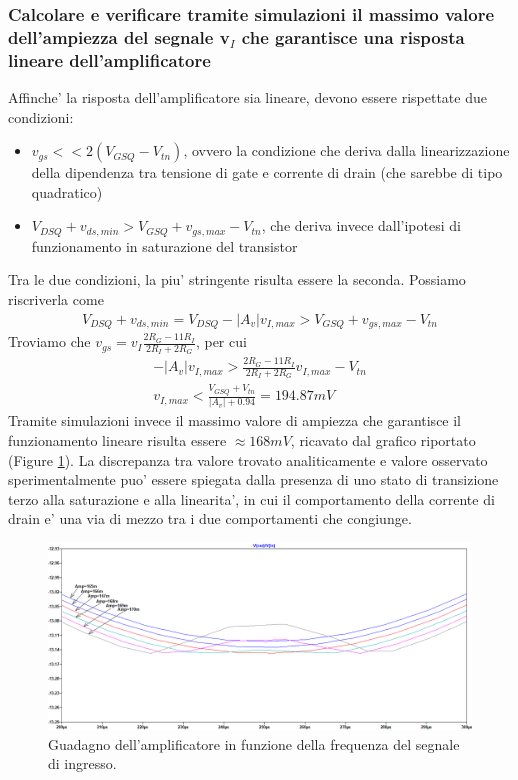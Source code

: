\documentclass[a4paper,10pt]{article}
\begin{document}
\subsubsection{Calcolare e verificare tramite simulazioni il massimo valore dell'ampiezza del segnale v$_I$ che garantisce una risposta lineare dell'amplificatore}
Affinche' la risposta dell'amplificatore sia lineare, devono essere rispettate due condizioni:
\begin{itemize}
 	\item \textit{$v_{gs} << 2(V_{GSQ}-V_{tn})$}, ovvero la condizione che deriva dalla linearizzazione della dipendenza tra tensione di gate e corrente di drain (che sarebbe di tipo quadratico)
 	\item \textit{$V_{DSQ} + v_{ds,min} > V_{GSQ}+v_{gs,max}-V_{tn}$}, che deriva invece dall'ipotesi di funzionamento in saturazione del transistor 
\end{itemize}
Tra le due condizioni, la piu' stringente risulta essere la seconda. Possiamo riscriverla come
\begin{gather*}
V_{DSQ} + v_{ds,min} = V_{DSQ} - |A_v|v_{I,max} > V_{GSQ}+v_{gs,max}-V_{tn} 
\end{gather*}
Troviamo che $v_{gs}=v_I\frac{2R_G-11R_I}{2R_I+2R_G}$, per cui
\begin{gather*}
-|A_v|v_{I,max} > \frac{2R_G-11R_I}{2R_I+2R_G}v_{I,max} - V_{tn} \\
v_{I,max} < \frac{V_{GSQ}+V_{tn}}{|A_v|+0.94} = 194.87mV
\end{gather*}
Tramite simulazioni invece il massimo valore di ampiezza che garantisce il funzionamento lineare risulta essere $\approx 168mV$, ricavato dal grafico riportato (Figure \ref{fig:effettodi2}). La discrepanza tra valore trovato analiticamente e valore osservato sperimentalmente puo' essere spiegata dalla presenza di uno stato di transizione terzo alla saturazione e alla linearita', in cui il comportamento della corrente di drain e' una via di mezzo tra i due comportamenti che congiunge.
\begin{figure}[h!]
  	\centering
 	\includegraphics[width=0.67\linewidth]{es2-2-6gain.png}
  	\caption{Guadagno dell'amplificatore in funzione della frequenza del segnale di ingresso.}
  	\label{fig:effettodi2}
\end{figure}
\newpage
\end{document}

